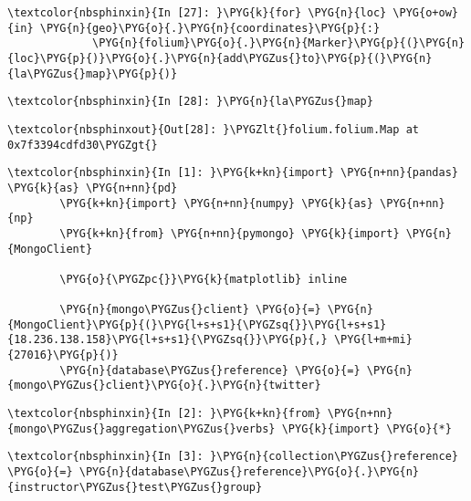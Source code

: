 \documentclass[letterpaper,10pt,english]{sphinxmanual}
\begin{document}
%
\begin{Verbatim}[commandchars=\\\{\}]
\textcolor{nbsphinxin}{In [27]: }\PYG{k}{for} \PYG{n}{loc} \PYG{o+ow}{in} \PYG{n}{geo}\PYG{o}{.}\PYG{n}{coordinates}\PYG{p}{:}
             \PYG{n}{folium}\PYG{o}{.}\PYG{n}{Marker}\PYG{p}{(}\PYG{n}{loc}\PYG{p}{)}\PYG{o}{.}\PYG{n}{add\PYGZus{}to}\PYG{p}{(}\PYG{n}{la\PYGZus{}map}\PYG{p}{)}
\end{Verbatim}

%
\begin{Verbatim}[commandchars=\\\{\}]
\textcolor{nbsphinxin}{In [28]: }\PYG{n}{la\PYGZus{}map}
\end{Verbatim}

%
\begin{Verbatim}[commandchars=\\\{\}]
\textcolor{nbsphinxout}{Out[28]: }\PYGZlt{}folium.folium.Map at 0x7f3394cdfd30\PYGZgt{}
\end{Verbatim}

%
\begin{Verbatim}[commandchars=\\\{\}]
\textcolor{nbsphinxin}{In [1]: }\PYG{k+kn}{import} \PYG{n+nn}{pandas} \PYG{k}{as} \PYG{n+nn}{pd}
        \PYG{k+kn}{import} \PYG{n+nn}{numpy} \PYG{k}{as} \PYG{n+nn}{np}
        \PYG{k+kn}{from} \PYG{n+nn}{pymongo} \PYG{k}{import} \PYG{n}{MongoClient}
        
        \PYG{o}{\PYGZpc{}}\PYG{k}{matplotlib} inline
        
        \PYG{n}{mongo\PYGZus{}client} \PYG{o}{=} \PYG{n}{MongoClient}\PYG{p}{(}\PYG{l+s+s1}{\PYGZsq{}}\PYG{l+s+s1}{18.236.138.158}\PYG{l+s+s1}{\PYGZsq{}}\PYG{p}{,} \PYG{l+m+mi}{27016}\PYG{p}{)}
        \PYG{n}{database\PYGZus{}reference} \PYG{o}{=} \PYG{n}{mongo\PYGZus{}client}\PYG{o}{.}\PYG{n}{twitter}
\end{Verbatim}

%
\begin{Verbatim}[commandchars=\\\{\}]
\textcolor{nbsphinxin}{In [2]: }\PYG{k+kn}{from} \PYG{n+nn}{mongo\PYGZus{}aggregation\PYGZus{}verbs} \PYG{k}{import} \PYG{o}{*}
\end{Verbatim}

%
\begin{Verbatim}[commandchars=\\\{\}]
\textcolor{nbsphinxin}{In [3]: }\PYG{n}{collection\PYGZus{}reference} \PYG{o}{=} \PYG{n}{database\PYGZus{}reference}\PYG{o}{.}\PYG{n}{instructor\PYGZus{}test\PYGZus{}group}
\end{Verbatim}
\end{document}
